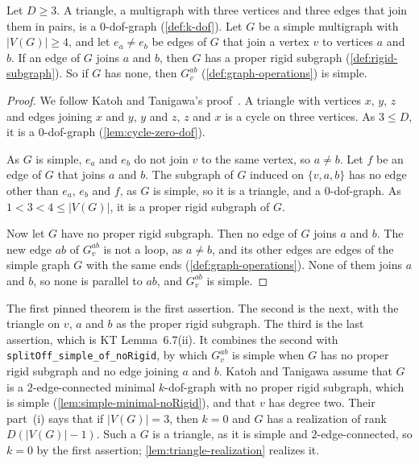 \begin{lemma}
  \label{lem:splitoff-simple}
  \leanok
  Let $D \ge 3$. A triangle, a multigraph with three vertices and three
  edges that join them in pairs, is a $0$-dof-graph
  (\cref{def:k-dof}). Let $G$ be a simple multigraph with
  $|V(G)| \ge 4$, and let $e_a \neq e_b$ be edges of $G$ that join a
  vertex $v$ to vertices $a$ and $b$. If an edge of $G$ joins $a$ and
  $b$, then $G$ has a proper rigid subgraph (\cref{def:rigid-subgraph}).
  So if $G$ has none, then $G_v^{ab}$ (\cref{def:graph-operations}) is
  simple.
\end{lemma}
\begin{proof}
  \leanok
  We follow Katoh and Tanigawa's proof~\cite[p.~677]{katohTanigawa2011}.
  A triangle with vertices $x$, $y$, $z$ and edges joining $x$ and $y$,
  $y$ and $z$, $z$ and $x$ is a cycle on three vertices. As $3 \le D$,
  it is a $0$-dof-graph (\cref{lem:cycle-zero-dof}).

  As $G$ is simple, $e_a$ and $e_b$ do not join $v$ to the same vertex,
  so $a \neq b$. Let $f$ be an edge of $G$ that joins $a$ and $b$. The
  subgraph of $G$ induced on $\{v, a, b\}$ has no edge other than $e_a$,
  $e_b$ and $f$, as $G$ is simple, so it is a triangle, and a
  $0$-dof-graph. As $1 < 3 < 4 \le |V(G)|$, it is a proper rigid
  subgraph of $G$.

  Now let $G$ have no proper rigid subgraph. Then no edge of $G$ joins
  $a$ and $b$. The new edge $ab$ of $G_v^{ab}$ is not a loop, as
  $a \neq b$, and its other edges are edges of the simple graph $G$ with
  the same ends (\cref{def:graph-operations}). None of them joins $a$
  and $b$, so none is parallel to $ab$, and $G_v^{ab}$ is simple.
\end{proof}
\begin{fmlnote}
  The first pinned theorem is the first assertion. The second is the
  next, with the triangle on $v$, $a$ and $b$ as the proper rigid
  subgraph. The third is the last assertion, which is KT Lemma~6.7(ii). It combines the
  second with
  \texttt{splitOff\_\allowbreak{}simple\_\allowbreak{}of\_\allowbreak{}noRigid},
  by which $G_v^{ab}$ is simple when $G$ has no proper rigid subgraph and
  no edge joining $a$ and $b$. Katoh and Tanigawa assume that $G$ is a
  $2$-edge-connected minimal $k$-dof-graph with no proper rigid
  subgraph, which is simple (\cref{lem:simple-minimal-noRigid}), and
  that $v$ has degree two. Their part~(i) says that if $|V(G)| = 3$, then
  $k = 0$ and $G$ has a realization of rank $D(|V(G)| - 1)$. Such a $G$
  is a triangle, as it is simple and $2$-edge-connected, so $k = 0$ by
  the first assertion; \cref{lem:triangle-realization} realizes it.
\end{fmlnote}

